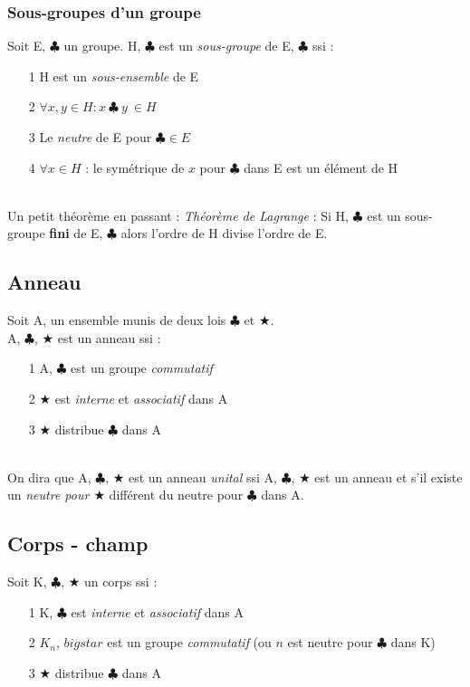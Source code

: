 \documentclass[12pt, a4paper, openany]{article}
\begin{document}
\subsubsection{Sous-groupes d'un groupe}
Soit E, $\clubsuit$ un groupe. H, $\clubsuit$ est un \textit{sous-groupe} de  E, $\clubsuit$ ssi :
\begin{itemize}
\item[1] H est un \textit{sous-ensemble} de E
\item[2] $\forall x, y \in H : x\ \clubsuit\ y\ \in H$
\item[3] Le \textit{neutre} de E pour $\clubsuit \in E$
\item[4] $\forall x \in H$ : le symétrique de $x$ pour $\clubsuit$ dans E est un élément de H
\end{itemize}
\ \\
Un petit théorème en passant : \textit{Théorème de Lagrange} : Si H, $\clubsuit$ est un sous-groupe \textbf{fini} de E, $\clubsuit$ alors l'ordre de H divise l'ordre de E.

\subsection{Anneau}
Soit A, un ensemble munis de deux lois $\clubsuit$ et $\bigstar$.\\
A, $\clubsuit$, $\bigstar$ est un anneau ssi :
\begin{itemize}
\item[1] A, $\clubsuit$ est un groupe \textit{commutatif}
\item[2] $\bigstar$ est \textit{interne} et \textit{associatif} dans A
\item[3] $\bigstar$ distribue $\clubsuit$ dans A
\end{itemize}
\ \\
On dira que A, $\clubsuit$, $\bigstar$ est un anneau \textit{unital} ssi A, $\clubsuit$, $\bigstar$ est un anneau et s'il existe un \textit{neutre pour $\bigstar$} différent du neutre pour $\clubsuit$ dans A.

\subsection{Corps - champ}
Soit K, $\clubsuit$, $\bigstar$ un corps ssi : 
\begin{itemize}
\item[1] K, $\clubsuit$ est \textit{interne} et \textit{associatif} dans A
\item[2] $K_{n}$, $bigstar$ est un groupe \textit{commutatif} (ou $n$ est neutre pour $\clubsuit$ dans K)

\item[3] $\bigstar$ distribue $\clubsuit$ dans A
\end{itemize}
\ \\
\end{document}
